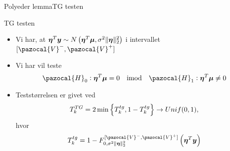 \begin{frame}{Polyeder lemma}{TG testen}
\begin{block}{TG testen}
\begin{itemize}
\item Vi har, at $\boldsymbol \eta^T \vy \sim N\del{\boldsymbol \eta^T \vmu , \sigma^2 \Vert \boldsymbol \eta \Vert^2_2}$ i intervallet $[\pazocal{V}^-, \pazocal{V}^+ ]$
\item  Vi har vil teste
\begin{align*}
 \pazocal{H}_0 : \boldsymbol \eta^T \vmu = 0 \quad \text{imod} \quad  \pazocal{H}_1 : \boldsymbol \eta^T \vmu  \neq 0
\end{align*}
\item Teststørrelsen er givet ved
\begin{align*}
T_k^{TG} = 2 \min \cbr{T_k^{tg}, 1 - T_k^{tg} }  \rightarrow Unif(0,1),
\end{align*}
hvor 
\begin{align*}
T_k^{tg} = 1 - F_{0, \sigma^2 \Vert \boldsymbol \eta \Vert^2_2}^{[\pazocal{V}^-, \pazocal{V}^+ ]} \del{\boldsymbol \eta^T \vy}
\end{align*}
\end{itemize}
\end{block}
\end{frame}


